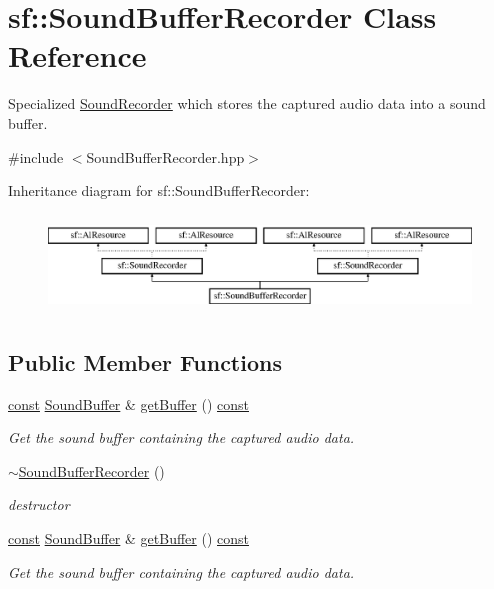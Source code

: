 \hypertarget{classsf_1_1_sound_buffer_recorder}{\section{sf\-:\-:Sound\-Buffer\-Recorder Class Reference}
\label{classsf_1_1_sound_buffer_recorder}
}


Specialized \hyperlink{classsf_1_1_sound_recorder}{Sound\-Recorder} which stores the captured audio data into a sound buffer.  




{\ttfamily \#include $<$Sound\-Buffer\-Recorder.\-hpp$>$}

Inheritance diagram for sf\-:\-:Sound\-Buffer\-Recorder\-:\begin{figure}[H]
\begin{center}
\leavevmode
\includegraphics[height=2.625000cm]{classsf_1_1_sound_buffer_recorder}
\end{center}
\end{figure}
\subsection*{Public Member Functions}
\begin{DoxyCompactItemize}
\item 
\hyperlink{term__entry_8h_a57bd63ce7f9a353488880e3de6692d5a}{const} \hyperlink{classsf_1_1_sound_buffer}{Sound\-Buffer} \& \hyperlink{classsf_1_1_sound_buffer_recorder_a84fd636ad22f434bafe2a7c15a8e5107}{get\-Buffer} () \hyperlink{term__entry_8h_a57bd63ce7f9a353488880e3de6692d5a}{const} 
\begin{DoxyCompactList}\small\item\em Get the sound buffer containing the captured audio data. \end{DoxyCompactList}\item 
\hyperlink{classsf_1_1_sound_buffer_recorder_a350f7f885ccfd12b4c6c120c23695637}{$\sim$\-Sound\-Buffer\-Recorder} ()
\begin{DoxyCompactList}\small\item\em destructor \end{DoxyCompactList}\item 
\hyperlink{term__entry_8h_a57bd63ce7f9a353488880e3de6692d5a}{const} \hyperlink{classsf_1_1_sound_buffer}{Sound\-Buffer} \& \hyperlink{classsf_1_1_sound_buffer_recorder_a84fd636ad22f434bafe2a7c15a8e5107}{get\-Buffer} () \hyperlink{term__entry_8h_a57bd63ce7f9a353488880e3de6692d5a}{const} 
\begin{DoxyCompactList}\small\item\em Get the sound buffer containing the captured audio data. \end{DoxyCompactList}\end{DoxyCompactItemize}
